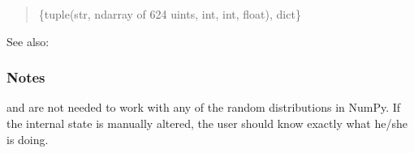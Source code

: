 \documentclass[letterpaper,10pt,english]{sphinxmanual}
\begin{document}
\begin{fulllineitems}
\begin{quote}
\begin{description}
\sphinxAtStartPar
\{tuple(str, ndarray of 624 uints, int, int, float), dict\}

\end{description}\end{quote}


\begin{sphinxseealso}{See also:}

\sphinxAtStartPar
{\hyperref[\detokenize{metilda.controllers:metilda.controllers.pitch_art_wizard.set_state}]{}}


\end{sphinxseealso}

\subsubsection*{Notes}

\sphinxAtStartPar
{} and  are not needed to work with any of the
random distributions in NumPy. If the internal state is manually altered,
the user should know exactly what he/she is doing.

\end{fulllineitems}


\begin{fulllineitems}
\label{\detokenize{metilda.controllers:metilda.controllers.pitch_art_wizard.get_student_recordings}}
\pysigstartsignatures
{}
\pysigstopsignatures
\end{fulllineitems}


\begin{fulllineitems}
\label{\detokenize{metilda.controllers:metilda.controllers.pitch_art_wizard.get_user_research_language}}
\pysigstartsignatures
{}
\pysigstopsignatures
\end{fulllineitems}
\end{document}
